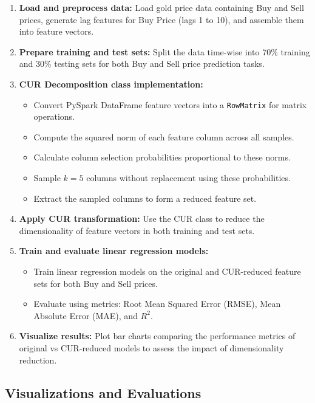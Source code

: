 \begin{enumerate}
    \item \textbf{Load and preprocess data:} Load gold price data containing Buy and Sell prices, generate lag features for Buy Price (lags 1 to 10), and assemble them into feature vectors.
    \item \textbf{Prepare training and test sets:} Split the data time-wise into 70\% training and 30\% testing sets for both Buy and Sell price prediction tasks.
    \item \textbf{CUR Decomposition class implementation:}
    \begin{itemize}
        \item Convert PySpark DataFrame feature vectors into a \texttt{RowMatrix} for matrix operations.
        \item Compute the squared norm of each feature column across all samples.
        \item Calculate column selection probabilities proportional to these norms.
        \item Sample $k=5$ columns without replacement using these probabilities.
        \item Extract the sampled columns to form a reduced feature set.
    \end{itemize}

    \item \textbf{Apply CUR transformation:} Use the CUR class to reduce the dimensionality of feature vectors in both training and test sets.
    \item \textbf{Train and evaluate linear regression models:}
    \begin{itemize}
        \item Train linear regression models on the original and CUR-reduced feature sets for both Buy and Sell prices.
        \item Evaluate using metrics: Root Mean Squared Error (RMSE), Mean Absolute Error (MAE), and $R^2$.
    \end{itemize}

    \item \textbf{Visualize results:} Plot bar charts comparing the performance metrics of original vs CUR-reduced models to assess the impact of dimensionality reduction.
\end{enumerate}

\subsection{Visualizations and Evaluations}
\label{subsec:visualizations-and-evaluations}

